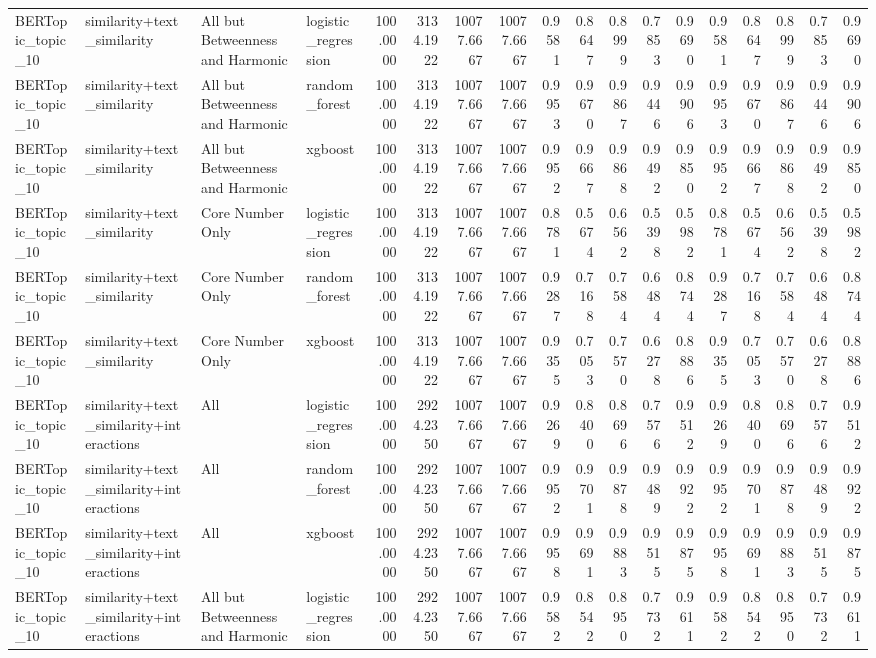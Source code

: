 \begin{tabular}{llllrrrrrrrrrrrrrr}
BERTopic_topic_10 & similarity+text_similarity & All but Betweenness and Harmonic & logistic_regression & 100.0000 & 3134.1922 & 10077.6667 & 10077.6667 & 0.9581 & 0.8647 & 0.8999 & 0.7853 & 0.9690 & 0.9581 & 0.8647 & 0.8999 & 0.7853 & 0.9690 \\
BERTopic_topic_10 & similarity+text_similarity & All but Betweenness and Harmonic & random_forest & 100.0000 & 3134.1922 & 10077.6667 & 10077.6667 & 0.9953 & 0.9670 & 0.9867 & 0.9446 & 0.9906 & 0.9953 & 0.9670 & 0.9867 & 0.9446 & 0.9906 \\
BERTopic_topic_10 & similarity+text_similarity & All but Betweenness and Harmonic & xgboost & 100.0000 & 3134.1922 & 10077.6667 & 10077.6667 & 0.9952 & 0.9667 & 0.9868 & 0.9492 & 0.9850 & 0.9952 & 0.9667 & 0.9868 & 0.9492 & 0.9850 \\
BERTopic_topic_10 & similarity+text_similarity & Core Number Only & logistic_regression & 100.0000 & 3134.1922 & 10077.6667 & 10077.6667 & 0.8781 & 0.5674 & 0.6562 & 0.5398 & 0.5982 & 0.8781 & 0.5674 & 0.6562 & 0.5398 & 0.5982 \\
BERTopic_topic_10 & similarity+text_similarity & Core Number Only & random_forest & 100.0000 & 3134.1922 & 10077.6667 & 10077.6667 & 0.9287 & 0.7168 & 0.7584 & 0.6484 & 0.8744 & 0.9287 & 0.7168 & 0.7584 & 0.6484 & 0.8744 \\
BERTopic_topic_10 & similarity+text_similarity & Core Number Only & xgboost & 100.0000 & 3134.1922 & 10077.6667 & 10077.6667 & 0.9355 & 0.7053 & 0.7570 & 0.6278 & 0.8886 & 0.9355 & 0.7053 & 0.7570 & 0.6278 & 0.8886 \\
BERTopic_topic_10 & similarity+text_similarity+interactions & All & logistic_regression & 100.0000 & 2924.2350 & 10077.6667 & 10077.6667 & 0.9269 & 0.8400 & 0.8696 & 0.7576 & 0.9512 & 0.9269 & 0.8400 & 0.8696 & 0.7576 & 0.9512 \\
BERTopic_topic_10 & similarity+text_similarity+interactions & All & random_forest & 100.0000 & 2924.2350 & 10077.6667 & 10077.6667 & 0.9952 & 0.9701 & 0.9878 & 0.9489 & 0.9922 & 0.9952 & 0.9701 & 0.9878 & 0.9489 & 0.9922 \\
BERTopic_topic_10 & similarity+text_similarity+interactions & All & xgboost & 100.0000 & 2924.2350 & 10077.6667 & 10077.6667 & 0.9958 & 0.9691 & 0.9883 & 0.9515 & 0.9875 & 0.9958 & 0.9691 & 0.9883 & 0.9515 & 0.9875 \\
BERTopic_topic_10 & similarity+text_similarity+interactions & All but Betweenness and Harmonic & logistic_regression & 100.0000 & 2924.2350 & 10077.6667 & 10077.6667 & 0.9582 & 0.8542 & 0.8950 & 0.7732 & 0.9611 & 0.9582 & 0.8542 & 0.8950 & 0.7732 & 0.9611 \\

\end{tabular}
